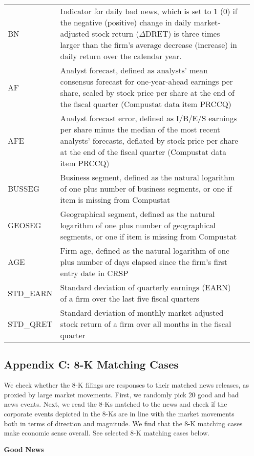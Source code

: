 \begin{table}[H]
\begin{tabular}{lp{15cm}p{15cm}}
		BN & Indicator for daily bad news, which is set to 1 (0) if the negative (positive) change in daily market-adjusted stock return ($\Delta$DRET) is three times larger than the firm’s average decrease (increase) in daily return over the calendar year.\\
		AF & Analyst forecast, defined as analysts' mean consensus forecast for one-year-ahead earnings per share, scaled by stock price per share at the end of the fiscal quarter (Compustat data item PRCCQ)\\
		AFE & Analyst forecast error, defined as I/B/E/S earnings per share minus the median of the most recent analysts' forecasts, deflated by stock price per share at the end of the fiscal quarter (Compustat data item PRCCQ)\\
		BUSSEG & Business segment, defined as the natural logarithm of one plus number of business segments, or one if item is missing from Compustat\\
		GEOSEG & Geographical segment, defined as the natural logarithm of one plus number of geographical segments, or one if item is missing from Compustat\\
		AGE & Firm age, defined as the natural logarithm of one plus number of days elapsed since the firm's first entry date in CRSP\\
		STD\_EARN & Standard deviation of quarterly earnings (EARN) of a firm over the last five fiscal quarters\\
		STD\_QRET & Standard deviation of monthly market-adjusted stock return of a firm over all months in the fiscal quarter\\
		\bottomrule
		\bottomrule
	\end{tabular}%
\end{table}%

\newpage
\subsection*{Appendix C: 8-K Matching Cases}
\label{appc}
We check whether the 8-K filings are responses to their matched news releases, as proxied by large market movements. First, we randomly pick 20 good and bad news events. Next, we read the 8-Ks matched to the news and check if the corporate events depicted in the 8-Ks are in line with the market movements both in terms of direction and magnitude. We find that the 8-K matching cases make economic sense overall. See selected 8-K matching cases below.
\begin{center}
	\textbf{Good News}
\end{center}
